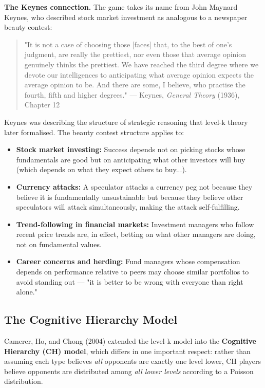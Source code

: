 \documentclass[12pt, letterpaper]{article}
\begin{document}
\newpage

\textbf{The Keynes connection.} The game takes its name from John Maynard Keynes, who described stock market investment as analogous to a newspaper beauty contest:

\begin{quote}
"It is not a case of choosing those [faces] that, to the best of one's judgment, are really the prettiest, nor even those that average opinion genuinely thinks the prettiest. We have reached the third degree where we devote our intelligences to anticipating what average opinion expects the average opinion to be. And there are some, I believe, who practise the fourth, fifth and higher degrees."
--- Keynes, \textit{General Theory} (1936), Chapter 12
\end{quote}

Keynes was describing the structure of strategic reasoning that level-k theory later formalised. The beauty contest structure applies to:

\begin{itemize}
\item \textbf{Stock market investing:} Success depends not on picking stocks whose fundamentals are good but on anticipating what other investors will buy (which depends on what they expect others to buy...).
\item \textbf{Currency attacks:} A speculator attacks a currency peg not because they believe it is fundamentally unsustainable but because they believe other speculators will attack simultaneously, making the attack self-fulfilling.
\item \textbf{Trend-following in financial markets:} Investment managers who follow recent price trends are, in effect, betting on what other managers are doing, not on fundamental values.
\item \textbf{Career concerns and herding:} Fund managers whose compensation depends on performance relative to peers may choose similar portfolios to avoid standing out --- "it is better to be wrong with everyone than right alone."
\end{itemize}


\subsection{The Cognitive Hierarchy Model}


Camerer, Ho, and Chong (2004) extended the level-k model into the \textbf{Cognitive Hierarchy (CH) model}, which differs in one important respect: rather than assuming each type believes \textit{all} opponents are exactly one level lower, CH players believe opponents are distributed among \textit{all lower levels} according to a Poisson distribution.
\end{document}
